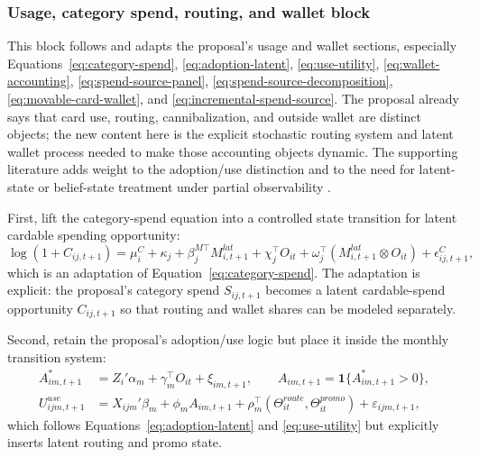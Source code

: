 \documentclass[11pt]{article}
\newcommand{\1}{\mathbf{1}}
\begin{document}
\subsubsection{Usage, category spend, routing, and wallet block}
\label{subsec:state-space-usage-wallet}

This block follows and adapts the proposal's usage and wallet sections,
especially Equations~\eqref{eq:category-spend},
\eqref{eq:adoption-latent}, \eqref{eq:use-utility},
\eqref{eq:wallet-accounting}, \eqref{eq:spend-source-panel},
\eqref{eq:spend-source-decomposition}, \eqref{eq:movable-card-wallet}, and
\eqref{eq:incremental-spend-source}. The proposal already says that card use,
routing, cannibalization, and outside wallet are distinct objects; the new
content here is the explicit stochastic routing system and latent wallet process
needed to make those accounting objects dynamic. The supporting literature adds
weight to the adoption/use distinction and to the need for latent-state or
belief-state treatment under partial observability
\citep{koulayev2012payment,agarwal2010rewards,prelec2001creditcard,
smallwood1973pomdp,kaelbling1998pomdp}.

First, lift the category-spend equation into a controlled state transition for
latent cardable spending opportunity:
\begin{equation}
  \log(1+C_{ij,t+1})
  =
  \mu_i^{C} + \kappa_j + \beta_j^{M\top}M^{lat}_{i,t+1}
  + \chi_j^{\top}O_{it}
  + \omega_j^{\top}(M^{lat}_{i,t+1}\otimes O_{it})
  + \epsilon^C_{ij,t+1},
  \label{eq:ss-cardable-spend}
\end{equation}
which is an adaptation of Equation~\eqref{eq:category-spend}. The adaptation is
explicit: the proposal's category spend $S_{ij,t+1}$ becomes a latent
cardable-spend opportunity $C_{ij,t+1}$ so that routing and wallet shares can be
modeled separately.

Second, retain the proposal's adoption/use logic but place it inside the
monthly transition system:
\begin{align}
  A^*_{im,t+1}
    &= Z_i'\alpha_m + \gamma_m^{\top}O_{it} + \xi_{im,t+1},
       \qquad A_{im,t+1}=\1\{A^*_{im,t+1}>0\},
       \label{eq:ss-adoption-transition}\\
  U^{use}_{ijm,t+1}
    &= X_{ijm}'\beta_m + \phi_m A_{im,t+1}
       + \rho_m^{\top}(\Theta^{route}_{it},\Theta^{promo}_{it})
       + \varepsilon_{ijm,t+1},
       \label{eq:ss-use-utility}
\end{align}
which follows Equations~\eqref{eq:adoption-latent} and
\eqref{eq:use-utility} but explicitly inserts latent routing and promo state.
\end{document}

